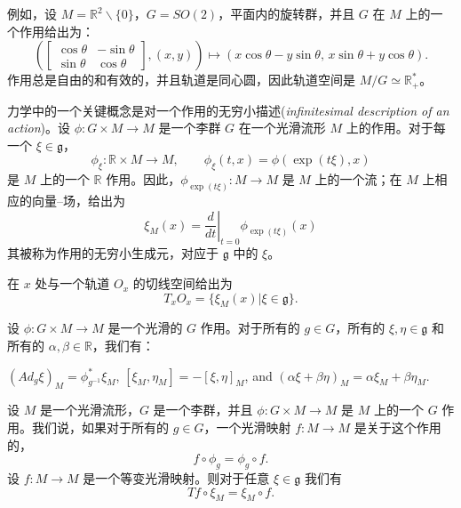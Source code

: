 \documentclass[11pt,fontset=founder]{ctexart}
\begin{document}
例如，设 $M=\mathbb{R}^{2}\backslash \{0\}$，$G=SO(2)$，平面内的旋转群，并且 $G$ 在 $M$ 上的一个作用给出为：
\begin{equation*}
\left( \left[
\begin{array}{cc}
\cos \theta & -\sin \theta \\
\sin \theta & \cos \theta%
\end{array}
\right] ,(x,y)\right) \longmapsto (x\cos \theta -y\sin \theta ,\,x\sin
\theta +y\cos \theta ).
\end{equation*}
作用总是自由的和有效的，并且轨道是同心圆，因此轨道空间是 $M/G\simeq \mathbb{R}_{+}^{\ast }$。

力学中的一个关键概念是对一个作用的无穷小描述(\textit{infinitesimal description of an action})。设 $\phi :G\times M\rightarrow M$ 是一个李群 $G$ 在一个光滑流形 $M$ 上的作用。对于每一个 $\xi \in \mathfrak{g}$，%
\begin{equation*}
\phi _{\xi }:\mathbb{R}\times M\rightarrow M,\qquad \phi _{\xi }(t,x)=\phi
\left( \exp (t\xi ),x\right)
\end{equation*}
是 $M$ 上的一个 $\mathbb{R}$ 作用。因此，$\phi _{\exp (t\xi)}:M\rightarrow M$ 是 $M$ 上的一个流；在 $M$ 上相应的向量–场，给出为
\begin{equation*}
\xi _{M}(x)=\left. \frac{d}{dt}\right| _{t=0}\phi _{\exp (t\xi )}(x)
\end{equation*}
其被称为作用的无穷小生成元，对应于 $\mathfrak{g}$ 中的 $\xi $。

在 $x$ 处与一个轨道 $O_{x}$ 的切线空间给出为
\begin{equation*}
T_{x}O_{x}=\{\xi _{M}(x)|\xi \in \mathfrak{g}\}.
\end{equation*}

设 $\phi :G\times M\rightarrow M$ 是一个光滑的 $G$ 作用。对于所有的 $g\in G$，所有的 $\xi ,\eta \in \mathfrak{g}$ 和所有的 $\alpha ,\beta \in \mathbb{R}$，我们有：

$\left( Ad_{g}\xi \right) _{M}=\phi _{g^{-1}}^{\ast }\xi _{M}$, $\left[ \xi
_{M},\eta _{M}\right] =-\left[ \xi ,\eta \right] _{M}$, and $(\alpha \xi
+\beta \eta )_{M}=\alpha \xi _{M}+\beta \eta _{M}$.

设 $M$ 是一个光滑流形，$G$ 是一个李群，并且 $\phi :G\times M\rightarrow M$ 是 $M$ 上的一个 $G$ 作用。我们说，如果对于所有的 $g\in G$，一个光滑映射 $f:M\rightarrow M$ 是关于这个作用的，
\begin{equation*}
f\circ \phi _{g}=\phi _{g}\circ f\text{.}
\end{equation*}
设 $f:M\rightarrow M$ 是一个等变光滑映射。则对于任意 $\xi \in \mathfrak{g}$ 我们有
\begin{equation*}
Tf\circ \xi _{M}=\xi _{M}\circ f.
\end{equation*}
\end{document}
